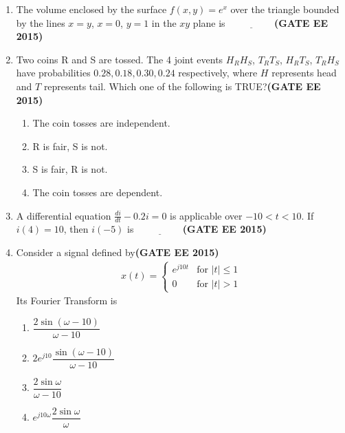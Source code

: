 \documentclass[a4paper,12pt]{exam}
\theoremstyle{remark}
\begin{document}
\begin{enumerate}
\item The volume enclosed by the surface $f(x,y) = e^x$ over the triangle bounded by the lines $x = y$, $x = 0$, $y = 1$ in the $xy$ plane is $\underline{\hspace{2cm}}$\hfill{\textbf{(GATE EE 2015)}}


\item Two coins R and S are tossed. The 4 joint events $H_RH_S$, $T_RT_S$, $H_RT_S$, $T_RH_S$ have probabilities $0.28, 0.18, 0.30, 0.24$ respectively, where $H$ represents head and $T$ represents tail. Which one of the following is TRUE?\hfill{\textbf{(GATE EE 2015)}}

\begin{enumerate}
    \item The coin tosses are independent.
    \item R is fair, S is not.
    \item S is fair, R is not.
    \item The coin tosses are dependent.
\end{enumerate}

\item A differential equation $\frac{di}{dt} - 0.2i = 0$ is applicable over $-10 < t < 10$. If $i(4) = 10$, then $i(-5)$ is $\underline{\hspace{2cm}}$\hfill{\textbf{(GATE EE 2015)}}
\item Consider a signal defined by\hfill{\textbf{(GATE EE 2015)}}
\begin{align}
x(t) = 
\begin{cases}
e^{j10t} & \text{for } |t| \leq 1 \\
0 & \text{for } |t| > 1
\end{cases}
\end{align}
Its Fourier Transform is

\begin{multicols}{2}
\begin{enumerate}
    \item $\dfrac{2 \sin (\omega - 10)}{\omega - 10}$
    \item $2 e^{j10} \dfrac{\sin (\omega - 10)}{\omega - 10}$
    \item $\dfrac{2 \sin \omega}{\omega - 10}$
    \item $e^{j10\omega} \dfrac{2 \sin \omega}{\omega}$
\end{enumerate}
\end{multicols}

\vspace{0.5cm}


\end{enumerate}
\end{document}
